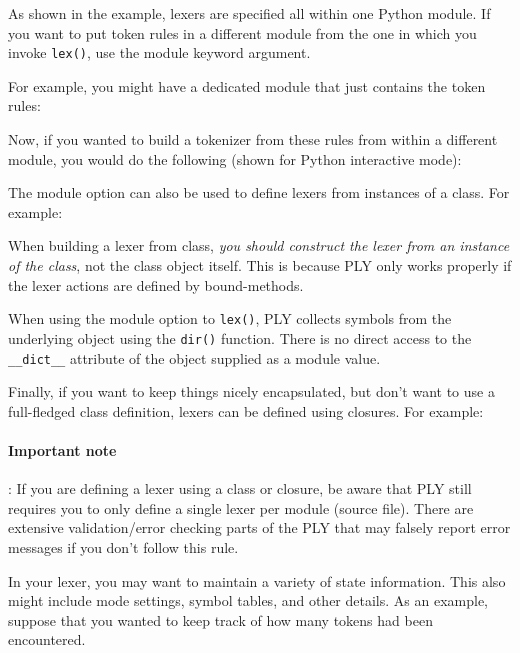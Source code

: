 
As shown in the example, lexers are specified all within one Python module. If
you want to put token rules in a different module from the one in which you
invoke \verb|lex()|, use the module keyword argument.

For example, you might have a dedicated module that just contains the token
rules:

Now, if you wanted to build a tokenizer from these rules from within a different
module, you would do the following (shown for Python interactive mode):

\label{plylexclass}

The module option can also be used to define lexers from instances of a class.
For example:

When building a lexer from class, \emph{you should construct the lexer from an
instance of the class}, not the class object itself. This is because PLY only
works properly if the lexer actions are defined by bound-methods.

When using the module option to \verb|lex()|, PLY collects symbols from the
underlying object using the \verb|dir()| function. There is no direct access to
the \verb|__dict__| attribute of the object supplied as a module value.


Finally, if you want to keep things nicely encapsulated, but don't want to use a
full-fledged class definition, lexers can be defined using closures. For
example:

\paragraph{Important note}: If you are defining a lexer using a class or
closure, be aware that PLY still requires you to only define a single lexer per
module (source file). There are extensive validation/error checking parts of the
PLY that may falsely report error messages if you don't follow this rule.


In your lexer, you may want to maintain a variety of state information. This
also might include mode settings, symbol tables, and other details. As an
example, suppose that you wanted to keep track of how many  tokens
had been encountered.

